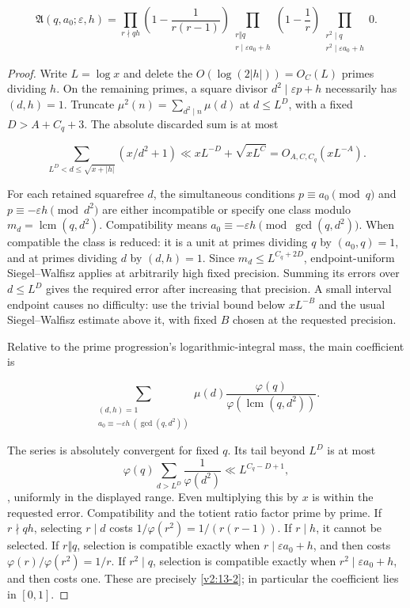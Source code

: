 \documentclass[11pt]{article}
\theoremstyle{definition}
\theoremstyle{remark}
\numberwithin{equation}{section}
\begin{document}
\begin{equation}\label{v2:13-2}
\mathfrak A(q,a_0;\varepsilon,h)=
\prod_{r\nmid qh}\left(1-\frac1{r(r-1)}\right)
\prod_{\substack{r\Vert q\\r\mid\varepsilon a_0+h}}\left(1-\frac1r\right)
\prod_{\substack{r^2\mid q\\r^2\mid\varepsilon a_0+h}}0.
\end{equation}


\begin{proof} Write $L=\log x$ and delete the $O(\log(2|h|))=O_C(L)$ primes dividing $h$. On the remaining primes, a square divisor $d^2\mid\varepsilon p+h$ necessarily has $(d,h)=1$. Truncate $\mu^2(n)=\sum_{d^2\mid n}\mu(d)$ at $d\le L^D$, with a fixed $D>A+C_q+3$. The absolute discarded sum is at most


\begin{equation}
\sum_{L^D<d\le\sqrt{x+|h|}}(x/d^2+1)
\ll xL^{-D}+\sqrt{xL^C}=O_{A,C,C_q}(xL^{-A}).
\end{equation}


For each retained squarefree $d$, the simultaneous conditions $p\equiv a_0\pmod q$ and $p\equiv-\varepsilon h\pmod{d^2}$ are either incompatible or specify one class modulo $m_d=\operatorname{lcm}(q,d^2)$. Compatibility means $a_0\equiv-\varepsilon h\pmod{\gcd(q,d^2)}$. When compatible the class is reduced: it is a unit at primes dividing $q$ by $(a_0,q)=1$, and at primes dividing $d$ by $(d,h)=1$. Since $m_d\le L^{C_q+2D}$, endpoint-uniform Siegel–Walfisz applies at arbitrarily high fixed precision. Summing its errors over $d\le L^D$ gives the required error after increasing that precision. A small interval endpoint causes no difficulty: use the trivial bound below $xL^{-B}$ and the usual Siegel–Walfisz estimate above it, with fixed $B$ chosen at the requested precision.

Relative to the prime progression's logarithmic-integral mass, the main coefficient is


\begin{equation}
\sum_{\substack{(d,h)=1\\a_0\equiv-\varepsilon h\ (\gcd(q,d^2))}}
\mu(d)\frac{\varphi(q)}{\varphi(\operatorname{lcm}(q,d^2))}.
\end{equation}


The series is absolutely convergent for fixed $q$. Its tail beyond $L^D$ is at most \[\varphi(q)\sum_{d>L^D}\frac1{\varphi(d^2)}\ll L^{C_q-D+1},\], uniformly in the displayed range. Even multiplying this by $x$ is within the requested error. Compatibility and the totient ratio factor prime by prime. If $r\nmid qh$, selecting $r\mid d$ costs $1/\varphi(r^2)=1/(r(r-1))$. If $r\mid h$, it cannot be selected. If $r\Vert q$, selection is compatible exactly when $r\mid\varepsilon a_0+h$, and then costs $\varphi(r)/\varphi(r^2)=1/r$. If $r^2\mid q$, selection is compatible exactly when $r^2\mid\varepsilon a_0+h$, and then costs one. These are precisely \eqref{v2:13-2}; in particular the coefficient lies in $[0,1]$.


\end{proof}
\end{document}
